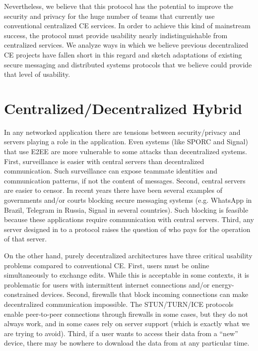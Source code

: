 \documentclass[runningheads]{llncs}
\begin{document}
Nevertheless, we believe that this protocol has the potential to improve the security and privacy for the huge number of teams that currently use conventional centralized CE services.
In order to achieve this kind of mainstream success, the protocol must provide usability nearly indistinguishable from centralized services.
We analyze ways in which we believe previous decentralized CE projects have fallen short in this regard and sketch adaptations of existing secure messaging and distributed systems protocols that we believe could provide that level of usability.

\section{Centralized{\slash}Decentralized Hybrid}

In any networked application there are tensions between security{\slash}privacy and servers playing a role in the application.
Even systems (like SPORC and Signal) that use E2EE are more vulnerable to some attacks than decentralized systems.
First, surveillance is easier with central servers than decentralized communication.
Such surveillance can expose teammate identities and communication patterns, if not the content of messages.
Second, central servers are easier to censor.
In recent years there have been several examples of governments and{\slash}or courts blocking secure messaging systems (e.g. WhatsApp in Brazil, Telegram in Russia, Signal in several countries).
Such blocking is feasible because these applications require communication with central servers.
Third, any server designed in to a protocol raises the question of who pays for the operation of that server.

On the other hand, purely decentralized architectures have three critical usability problems compared to conventional CE.
First, users must be online simultaneously to exchange edits\footnotemark{}.
While this is acceptable in some contexts, it is problematic for users with intermittent internet connections and{\slash}or energy-constrained devices.
Second, firewalls that block incoming connections can make decentralized communication impossible.
The STUN{\slash}TURN{\slash}ICE protocols enable peer-to-peer connections through firewalls in some cases, but they do not always work, and in some cases rely on server support (which is exactly what we are trying to avoid).
Third, if a user wants to access their data from a ``new'' device, there may be nowhere to download the data from at any particular time.
\end{document}
